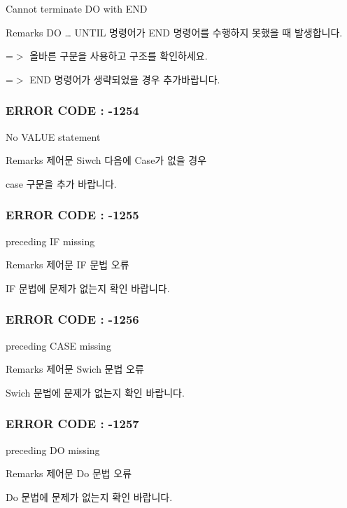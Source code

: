 Cannot terminate D\-O with E\-N\-D \begin{DoxyRemark}{Remarks}
D\-O … U\-N\-T\-I\-L 명령어가 E\-N\-D 명령어를 수행하지 못했을 때 발생합니다. \par
 =$>$ 올바른 구문을 사용하고 구조를 확인하세요.\par
 =$>$ E\-N\-D 명령어가 생략되었을 경우 추가바랍니다.
\end{DoxyRemark}


 \subsubsection*{E\-R\-R\-O\-R C\-O\-D\-E \-: -\/1254 }

No V\-A\-L\-U\-E statement \begin{DoxyRemark}{Remarks}
제어문 Siwch 다음에 Case가 없을 경우\par
 case 구문을 추가 바랍니다.
\end{DoxyRemark}


 \subsubsection*{E\-R\-R\-O\-R C\-O\-D\-E \-: -\/1255 }

preceding I\-F missing \begin{DoxyRemark}{Remarks}
제어문 I\-F 문법 오류\par
 I\-F 문법에 문제가 없는지 확인 바랍니다.
\end{DoxyRemark}


 \subsubsection*{E\-R\-R\-O\-R C\-O\-D\-E \-: -\/1256 }

preceding C\-A\-S\-E missing \begin{DoxyRemark}{Remarks}
제어문 Swich 문법 오류\par
 Swich 문법에 문제가 없는지 확인 바랍니다.
\end{DoxyRemark}


 \subsubsection*{E\-R\-R\-O\-R C\-O\-D\-E \-: -\/1257 }

preceding D\-O missing \begin{DoxyRemark}{Remarks}
제어문 Do 문법 오류\par
 Do 문법에 문제가 없는지 확인 바랍니다.
\end{DoxyRemark}


